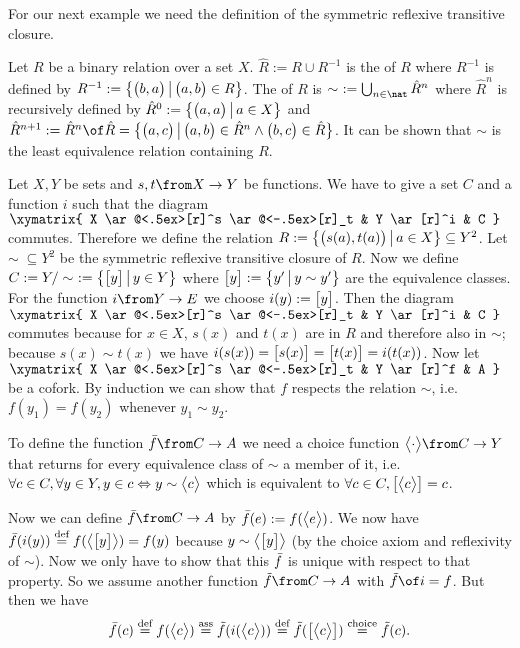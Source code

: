 For our next example we need the definition of the symmetric reflexive transitive closure.

\begin{definition}
  \label{def:srtc}
  Let $R$ be a binary relation over a set $X$.
  $\hat{R} := R \cup R^{-1}$ is the  of $R$ where $R^{-1}$ is defined by
  $R^{-1} := \bigl \{ \bigl( b , a \bigr) \,\big|\, \bigl( a , b \bigr) \in R \bigr \}$.
  The  of $R$ is $\sim ~:= \bigcup_{n\in\nat} {\hat R}^n$
  where ${\hat R}^n$ is recursively defined by
  ${\hat R}^0 := \bigl \{ \bigl( a , a \bigr) \,\big|\, a \in X \bigr \}$ and
  ${\hat R}^{n+1} := {\hat R}^n \of \hat R = \setMap{\pair{a}{c}}{\pair{a}{b} \in {\hat R}^n \land \pair{b}{c} \in \hat R}$.
  It can be shown that $\sim$ is the least equivalence relation containing $R$.
\end{definition}

\begin{example}
  \label{ex:coequa:quotient}
  Let $X, Y$ be sets and $s, t \from X \to Y$ be functions.
  We have to give a set $C$ and a function $i$ such that the diagram
  $ \xymatrix{
    X \ar@<.5ex>[r]^s \ar@<-.5ex>[r]_t & Y \ar[r]^i & C
  } $
  commutes.
  Therefore we define the relation
  $R := \bigl \{ \bigl( s(a) , t(a) \bigr) \,\big|\, a \in X \bigr \} \subseteq Y^2$.
  Let $\sim \; \subseteq Y^2$ be the symmetric reflexive transitive closure of $R$.
  Now we define $C := Y / \sim ~:= \bigl \{ \bigl[ y \bigr] \,\big|\, y \in Y \bigr \}$ where $\bigl[ y \bigr] := \bigl \{ y' \,\big|\, y \sim y' \bigr \}$ are the equivalence classes.
  For the function $i \from Y \to E$ we choose $i(y) := \bigl[ y \bigr]$.
  Then the diagram
  $ \xymatrix{
    X \ar@<.5ex>[r]^s \ar@<-.5ex>[r]_t & Y \ar[r]^i & C
  } $
  commutes because for $x \in X$, $s(x)$ and $t(x)$ are in $R$ and therefore also in $\sim$; because $s(x) \sim t(x)$ we have $i(s(x)) = \bigl[ s(x) \bigr] = \bigl[ t(x) \bigr] = i(t(x))$.
  Now let
  $ \xymatrix{
    X \ar@<.5ex>[r]^s \ar@<-.5ex>[r]_t & Y \ar[r]^f & A
  } $
  be a cofork.
  By induction we can show that $f$ respects the relation $\sim$, i.e. $f(y_1) = f(y_2)$ whenever $y_1 \sim y_2$.

  To define the function $\fbar \from C \to A$ we need a choice function $\choice \cdot \from C \to Y$ that returns for every equivalence class of $\sim$ a member of it, i.e.
  $\forall c \in C, \forall y \in Y, y \in c \Leftrightarrow y \sim \bigl< c \bigr>$
  which is equivalent to $\forall c \in C, \bigl[ \bigl< c \bigr> \bigr] = c$.

  Now we can define $\fbar \from C \to A$ by $\bar{f}(e) := f(\bigl< e \bigr>)$.
  We now have  $\bar{f}(i(y)) \stackrel{\text{def}}{=} f(\bigl< \bigl[ y \bigr] \bigr>) = f(y)$ because $y \sim \bigl< \bigl[ y \bigr] \bigr>$ (by the choice axiom and reflexivity of $\sim$).
  Now we only have to show that this $\bar{f}$ is unique with respect to that property.
  So we assume another function $\ftilde \from C \to A$ with $\ftilde \of i = f$. But then we have
  $$ \bar{f}(c) \stackrel{\text{def}}{=} f(\bigl< c \bigr>) \stackrel{\text{ass}}{=} \tilde{f}(i(\bigl< c \bigr>)) \stackrel{\text{def}}{=} \tilde{f}(\bigl[ \bigl< c \bigr> \bigr]) \stackrel{\text{choice}}{=} \tilde{f}(c).$$
\end{example}


